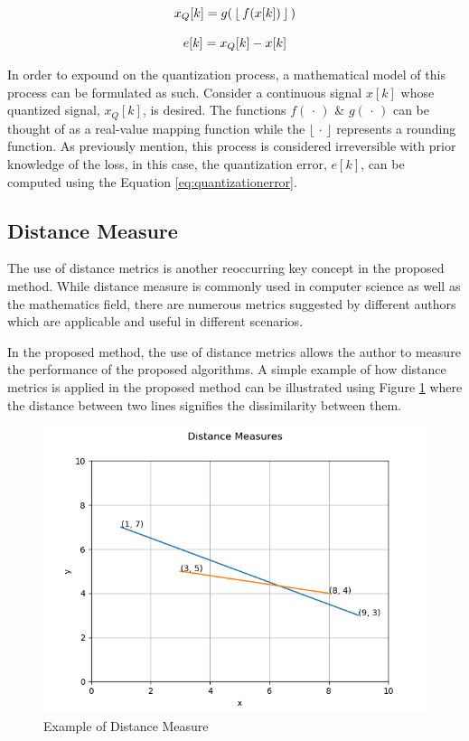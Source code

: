 \begin{equation}\centering
\label{eq:quantization}
x_Q[k] = g( \mspace{3mu}\lfloor \mspace{3mu}f(x[k]) \mspace{3mu}\rfloor\mspace{3mu})
\end{equation} 

\vspace{-3em}


\begin{equation}\centering
\label{eq:quantizationerror}
e[k] = x_Q[k] - x[k]
\end{equation}


In order to expound on the quantization process, a mathematical model of this process can be formulated as such. Consider a continuous signal $x[k]$ whose quantized signal, $x_Q[k]$, is desired. The functions $f (\mspace{3mu} \cdot  \mspace{3mu})$ \& $g (\mspace{3mu} \cdot  \mspace{3mu})$ can be thought of as a real-value mapping function while the $\lfloor \mspace{3mu} \cdot  \mspace{3mu} \rfloor$ represents a rounding function. As previously mention, this process is considered irreversible with prior knowledge of the loss, in this case, the quantization error, $e[k]$, can be computed using the Equation \ref{eq:quantizationerror}. 

\subsection{Distance Measure}
\label{section:distancemeasures}

The use of distance metrics is another reoccurring key concept in the proposed method. While distance measure is commonly used in computer science as well as the mathematics field, there are numerous metrics suggested by different authors which are applicable and useful in different scenarios.   

In the proposed method, the use of distance metrics allows the author to measure the performance of the proposed algorithms. A simple example of how distance metrics is applied in the proposed method can be illustrated using Figure \ref{fig:distanceMeasure} where the distance between two lines signifies the dissimilarity between them. 



\begin{figure}[hbt!]\centering
\includegraphics[width=.7\textwidth]{image/general/distance.png}
\caption{Example of Distance Measure}
\label{fig:distanceMeasure}
\end{figure}

